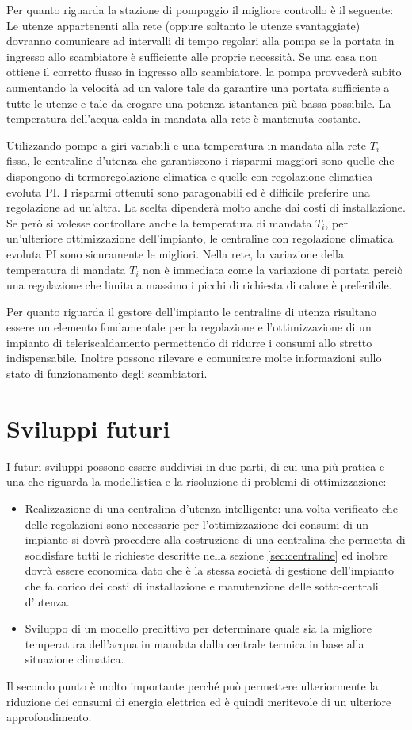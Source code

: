 \documentclass[laurea,oneside,11pt]{USiena_tesiLM}
\begin{document}
Per quanto riguarda la stazione di pompaggio il migliore controllo è il seguente: Le utenze appartenenti alla rete (oppure soltanto le utenze svantaggiate)  dovranno comunicare ad intervalli di tempo regolari alla pompa se la portata in ingresso allo scambiatore è sufficiente alle proprie necessità. Se una casa non ottiene il corretto flusso in ingresso allo scambiatore, la pompa provvederà subito aumentando la velocità ad un valore tale da garantire una portata sufficiente a tutte le utenze e tale da erogare una potenza istantanea più bassa possibile. La temperatura dell'acqua calda in mandata alla rete è mantenuta costante.

Utilizzando pompe a giri variabili e una temperatura in mandata alla rete $T_i$ fissa, le centraline d'utenza che garantiscono i risparmi maggiori sono quelle che dispongono di termoregolazione climatica e quelle con regolazione climatica evoluta PI. I risparmi ottenuti sono paragonabili ed è difficile preferire una regolazione ad un'altra. La scelta dipenderà molto anche dai costi di installazione. Se però si volesse controllare anche la temperatura di mandata $T_i$, per un'ulteriore ottimizzazione dell'impianto, le centraline con regolazione climatica evoluta PI sono sicuramente le migliori. Nella rete, la variazione della temperatura di mandata $T_i$ non è immediata come la variazione di portata perciò una regolazione che limita a massimo i picchi di richiesta di calore è preferibile.

Per quanto riguarda il gestore dell'impianto le centraline di utenza risultano essere un elemento fondamentale per la regolazione e l'ottimizzazione di un impianto di teleriscaldamento permettendo di ridurre i consumi allo stretto indispensabile.  Inoltre possono rilevare e comunicare   molte informazioni sullo stato di funzionamento degli scambiatori.


\section{Sviluppi futuri}
I futuri sviluppi possono essere suddivisi in due parti, di cui una più pratica e una che riguarda la modellistica e la risoluzione di problemi di ottimizzazione: 
\begin{itemize}
\item  Realizzazione di una centralina d'utenza intelligente: una volta verificato che delle regolazioni sono necessarie per l'ottimizzazione dei consumi di un impianto si dovrà procedere alla costruzione di una centralina che permetta di soddisfare tutti le richieste descritte nella sezione \ref{sec:centraline} ed inoltre dovrà essere economica dato che è la stessa società  di gestione dell'impianto che fa carico dei costi di installazione e manutenzione delle sotto-centrali d'utenza.
\item Sviluppo di un modello predittivo per determinare quale sia la migliore temperatura dell'acqua in mandata dalla centrale termica in base alla situazione climatica.
\end{itemize}
Il secondo punto è molto importante perché può permettere ulteriormente la riduzione dei consumi di energia elettrica ed è quindi meritevole di un ulteriore approfondimento. 
 
\end{document}
